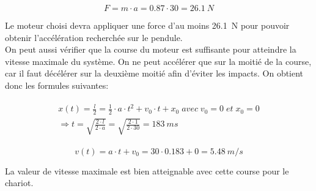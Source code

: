 \begin{equation}\label{eq:ForceMot}
    F = m \cdot a = 0.87 \cdot 30 = 26.1~N
\end{equation}

Le moteur choisi devra appliquer une force d'au moins 26.1~N pour pouvoir obtenir l'accélération recherchée sur le pendule.\\

On peut aussi vérifier que la course du moteur est suffisante pour atteindre la vitesse maximale du système. On ne peut accélérer que sur la
moitié de la course, car il faut décélérer sur la deuxième moitié afin d'éviter les impacts. On obtient donc les formules suivantes:

\begin{align}\label{eq:TempsMouv}
    \begin{split}
        x(t) = \frac{l}{2} = \frac{1}{2} \cdot a \cdot t^2 + v_0 \cdot t + x_0 \; avec \; v_0 = 0 \; et \; x_0 = 0 \\ \Rightarrow t = \sqrt{\frac{2 \cdot l}{2 \cdot a}} = \sqrt{\frac{2 \cdot 1}{2 \cdot 30}} = 183~ms
    \end{split}
\end{align}

\begin{equation}
    v(t) = a \cdot t + v_0 = 30 \cdot 0.183 + 0 = 5.48~m/s
\end{equation}

La valeur de vitesse maximale est bien atteignable avec cette course pour le chariot.